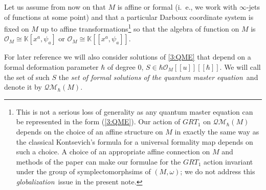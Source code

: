 \documentclass{amsart}
\theoremstyle{plain}
\theoremstyle{definition}
\begin{document}
Let us assume from now on that $M$ is affine or formal (i.~e., we work with $\infty$-jets of functions at some point) and that a particular Darboux coordinate system is fixed on $M$ up to affine transformations\footnote{This is not a serious loss of generality as any quantum master equation can be represented in the form (\ref{3:QME}). Our action of ${GRT_1}$ on ${{\mathcal Q}}{{\mathcal M}}_\hbar(M)$
depends on the choice of an affine structure on $M$ in exactly the same way as
the classical Kontsevich's  formula for a universal formality  map \cite{Ko2} depends on such a choice. A choice of an appropriate affine connection on $M$ and methods of the paper \cite{D} can make our formulae for the ${GRT_1}$ action invariant under the group of symplectomorphsims of $(M,{\omega})$; we do not address this {\em globalization}\, issue in the present note.} so that the algebra of function on $M$ is ${{\mathcal O}}_M\cong {{\mathbb K}}[x^a,\psi_a]$ or ${{\mathcal O}}_M\cong {{\mathbb K}}[[x^a,\psi_a]]$.

{\smallskip}

For later reference we will also consider solutions of \eqref{3:QME} that depend on a formal deformation parameter $\hbar$ of degree 0, $S\in \hbar {{\mathcal O}}_M[[u]][[\hbar]]$. We will call the set of such $S$ the \emph{set of formal solutions of the quantum master equation}\, and denote it by ${{\mathcal Q}}{{\mathcal M}}_\hbar(M)$.
\end{document}
